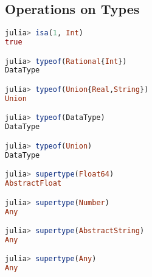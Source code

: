 \subsection{Operations on Types}
\begin{lstlisting}[language=julia]
julia> isa(1, Int)
true

julia> typeof(Rational{Int})
DataType

julia> typeof(Union{Real,String})
Union

julia> typeof(DataType)
DataType

julia> typeof(Union)
DataType

julia> supertype(Float64)
AbstractFloat

julia> supertype(Number)
Any

julia> supertype(AbstractString)
Any

julia> supertype(Any)
Any
\end{lstlisting}
